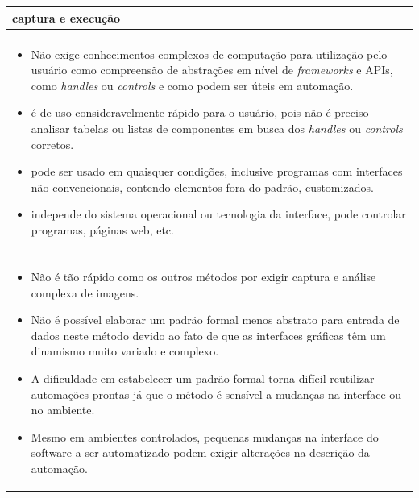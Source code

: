 \documentclass[tg]{mdtufsm}
\begin{document}
{                \begin{tabularx}{\textwidth}{|*{1}{>{\centering\arraybackslash}X}|}
                    \hline
                    captura e execução \\
                    \hline
                    {\bf prós:} \\
                    \begin{itemize}
                        \item Não exige conhecimentos complexos de computação para utilização pelo usuário como compreensão de abstrações em nível de \emph{frameworks} e APIs, como \emph{handles} ou \emph{controls} e como podem ser úteis em automação.
                        \item é de uso consideravelmente rápido para o usuário, pois não é preciso analisar tabelas ou listas de componentes em busca dos \emph{handles} ou \emph{controls} corretos.
                        \item pode ser usado em quaisquer condições, inclusive programas com interfaces não convencionais, contendo elementos fora do padrão, customizados.
                        \item independe do sistema operacional ou tecnologia da interface, pode controlar programas, páginas web, etc.
                    \end{itemize}
                    \\ {\bf contras:} \\
                    \begin{itemize}
                        \item Não é tão rápido como os outros métodos por exigir captura e análise complexa de imagens.
                        \item Não é possível elaborar um padrão formal menos abstrato para entrada de dados neste método devido ao fato de que as interfaces gráficas têm um dinamismo muito variado e complexo.
                        \item A dificuldade em estabelecer um padrão formal torna difícil reutilizar automações prontas já que o método é sensível a mudanças na interface ou no ambiente.
                        \item Mesmo em ambientes controlados, pequenas mudanças na interface do software a ser automatizado podem exigir alterações na descrição da automação.
                    \end{itemize}
                    \\ \hline
                \end{tabularx}
                }
\end{document}
